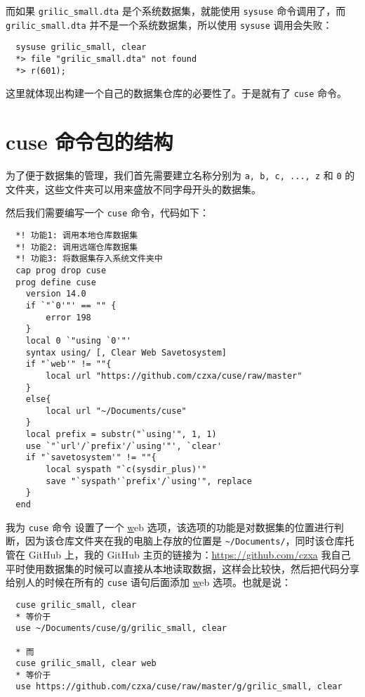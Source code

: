 \documentclass[lang=cn,11pt]{elegantpaper}
\begin{document}
而如果 \lstinline{grilic_small.dta} 是个系统数据集，就能使用 \lstinline{sysuse} 命令调用了，而 \lstinline{grilic_small.dta} 并不是一个系统数据集，所以使用  \lstinline{sysuse} 调用会失败：

\begin{lstlisting}
  sysuse grilic_small, clear
  *> file "grilic_small.dta" not found
  *> r(601);
\end{lstlisting}

这里就体现出构建一个自己的数据集仓库的必要性了。于是就有了 \lstinline{cuse} 命令。

\section{cuse 命令包的结构}

为了便于数据集的管理，我们首先需要建立名称分别为 \lstinline{a, b, c, ..., z} 和 \lstinline{0} 的文件夹，这些文件夹可以用来盛放不同字母开头的数据集。

然后我们需要编写一个 \lstinline{cuse} 命令，代码如下：

\begin{lstlisting}
  *! 功能1: 调用本地仓库数据集
  *! 功能2: 调用远端仓库数据集
  *! 功能3: 将数据集存入系统文件夹中
  cap prog drop cuse
  prog define cuse
  	version 14.0
  	if `"`0'"' == "" {
  		error 198
  	}
  	local 0 `"using `0'"'
  	syntax using/ [, Clear Web Savetosystem]
  	if "`web'" != ""{
  		local url "https://github.com/czxa/cuse/raw/master"
  	}
  	else{
  		local url "~/Documents/cuse"
  	}
  	local prefix = substr("`using'", 1, 1)
  	use `"`url'/`prefix'/`using'"', `clear'
  	if "`savetosystem'" != ""{
  		local syspath "`c(sysdir_plus)'"
  		save "`syspath'`prefix'/`using'", replace
  	}
  end
\end{lstlisting}

我为 \lstinline{cuse} 命令 设置了一个 \underline{w}eb 选项，该选项的功能是对数据集的位置进行判断，因为该仓库文件夹在我的电脑上存放的位置是 \lstinline{~/Documents/}，同时该仓库托管在 GitHub 上，我的 GitHub 主页的链接为：\url{https://github.com/czxa} 我自己平时使用数据集的时候可以直接从本地读取数据，这样会比较快，然后把代码分享给别人的时候在所有的 \lstinline{cuse} 语句后面添加 \underline{w}eb 选项。也就是说：

\begin{lstlisting}
  cuse grilic_small, clear
  * 等价于
  use ~/Documents/cuse/g/grilic_small, clear

  * 而
  cuse grilic_small, clear web
  * 等价于
  use https://github.com/czxa/cuse/raw/master/g/grilic_small, clear
\end{lstlisting}
\end{document}
